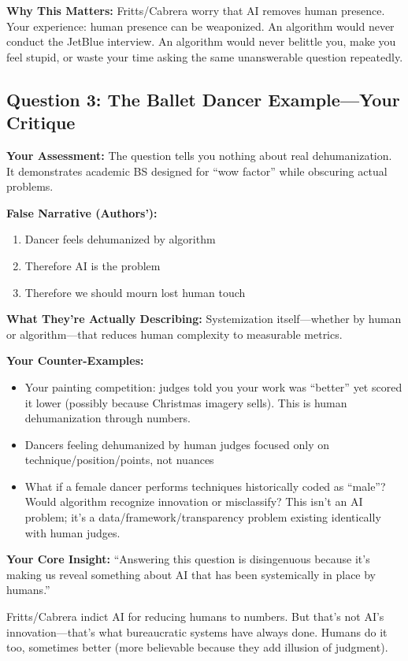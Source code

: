 \documentclass[12pt,letterpaper]{article}
\begin{document}
\textbf{Why This Matters:} Fritts/Cabrera worry that AI removes human presence. Your experience: human presence can be weaponized. An algorithm would never conduct the JetBlue interview. An algorithm would never belittle you, make you feel stupid, or waste your time asking the same unanswerable question repeatedly.

\subsection{Question 3: The Ballet Dancer Example---Your Critique}

\textbf{Your Assessment:} The question tells you nothing about real dehumanization. It demonstrates academic BS designed for ``wow factor'' while obscuring actual problems.

\begin{keyfindings}
\textbf{False Narrative (Authors'):}
\begin{enumerate}[leftmargin=*,noitemsep,font=\small]
    \item Dancer feels dehumanized by algorithm
    \item Therefore AI is the problem
    \item Therefore we should mourn lost human touch
\end{enumerate}

\textbf{What They're Actually Describing:}
Systemization itself---whether by human or algorithm---that reduces human complexity to measurable metrics.
\end{keyfindings}

\textbf{Your Counter-Examples:}
\begin{itemize}[leftmargin=*,noitemsep,font=\small]
    \item Your painting competition: judges told you your work was ``better'' yet scored it lower (possibly because Christmas imagery sells). This is human dehumanization through numbers.
    \item Dancers feeling dehumanized by human judges focused only on technique/position/points, not nuances
    \item What if a female dancer performs techniques historically coded as ``male''? Would algorithm recognize innovation or misclassify? This isn't an AI problem; it's a data/framework/transparency problem existing identically with human judges.
\end{itemize}

\begin{livedexperience}
\textbf{Your Core Insight:} ``Answering this question is disingenuous because it's making us reveal something about AI that has been systemically in place by humans.''

Fritts/Cabrera indict AI for reducing humans to numbers. But that's not AI's innovation---that's what bureaucratic systems have always done. Humans do it too, sometimes better (more believable because they add illusion of judgment).
\end{livedexperience}
\end{document}
